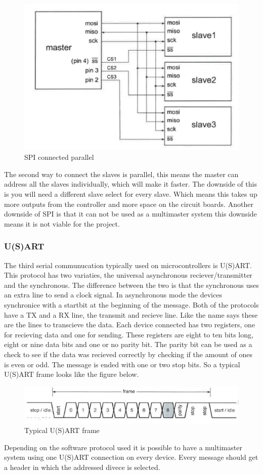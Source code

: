 \documentclass[10pt,a4paper]{article}
\begin{document}
\begin{figure}[H]
        \centering
        \graphicspath{ {./images/} }
        \includegraphics[scale=.4]{SPIparallel}
        \caption{SPI connected parallel}
        \label{fig:SPIparallel}
\end{figure}
The second way to connect the slaves is parallel, this means the master can address all the slaves individually, which will make it faster. The downside of this is you will need a different slave select for every slave. Which means this takes up more outputs from the controller and more space on the circuit boards.
Another downside of SPI is that it can not be used as a multimaster system this downside means it is not viable for the project.
\subsubsection{U(S)ART}
The third serial communucation typically used on microcontrollers is U(S)ART. This protocol has two variaties, the universal asynchronous reciever/transmitter and the synchronous. The difference between the two is that the synchronous uses an extra line to send a clock signal. In asynchronous mode the devices synchronice with a startbit at the beginning of the message.
Both of the protocols have a TX and a RX line, the transmit and recieve line. Like the name says these are the lines to transcieve the data. Each device connected has two registers, one for recieving data and one for sending. These registers are eight to ten bits long, eight or nine data bits and one or no parity bit. The parity bit can be used as a check to see if the data was recieved correctly by checking if the amount of ones is even or odd. The message is ended with one or two stop bits. So a typical U(S)ART frame looks like the figure below.
\begin{figure}[H]
        \centering
        \graphicspath{ {./images/} }
        \includegraphics[scale=.4]{UARTframe}
        \caption{Typical U(S)ART frame}
        \label{fig:UARTframe}
\end{figure}
Depending on the software protocol used it is possible to have a multimaster system using one U(S)ART connection on every device. Every message should get a header in which the addressed divece is selected.
\end{document}
